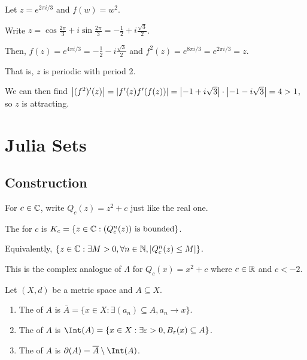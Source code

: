 \documentclass[class=pmath370,tikz,notes]{agony}
\begin{document}
\begin{example}
  Let $z = e^{2\pi i/3}$ and $f(w) = w^2$.
\end{example}
\begin{sol}
  Write $z = \cos\frac{2\pi}{3} + i\sin\frac{2\pi}{3} = -\frac12 + i\frac{\sqrt3}2$.

  Then, $f(z) = e^{4\pi i/3} = -\frac12 - i\frac{\sqrt3}{2}$
  and $f^2(z) = e^{8\pi i/3} = e^{2\pi i/3} = z$.

  That is, $z$ is periodic with period 2.

  We can then find $\abs{(f^2)'(z)} = \abs{f'(z)f'(f(z))} = \abs{-1+i\sqrt3}\cdot\abs{-1-i\sqrt3} = 4 > 1$,
  so $z$ is attracting.
\end{sol}

\chapter{Julia Sets}

\section{Construction}

\begin{notation}
  For $c \in \mathbb{C}$, write $Q_c(z) = z^2 + c$ just like the real one.
\end{notation}

\begin{defn}
  The  for $c$ is $K_c = \qty{z \in \ensuremath{\mathbb{C}}: \text{$(Q_c^n(z))$ is bounded}}$.

  Equivalently, $\qty{z \in \ensuremath{\mathbb{C}}: \exists M > 0, \forall n \in \ensuremath{\mathbb{N}}, \abs{Q_c^n(z) \leq M}}$.
\end{defn}

\begin{remark}
  This is the complex analogue of $\Lambda$ for $Q_c(x) = x^2 + c$
  where $c \in \mathbb{R}$ and $c < -2$.
\end{remark}

\begin{defn}
  Let $(X,d)$ be a metric space and $A \subseteq X$.
  \begin{enumerate}[nosep]
    \item The  of $A$ is $\overline{A} = \{x \in X : \exists (a_n) \subseteq A, a_n \to x\}$.
    \item The  of $A$ is $\Int(A) = \{x \in X : \exists \varepsilon>0,B_\varepsilon(x) \subseteq A\}$.
    \item The  of $A$ is $\partial(A) = \overline{A} \setminus \Int(A)$.
  \end{enumerate}
\end{defn}
\end{document}
